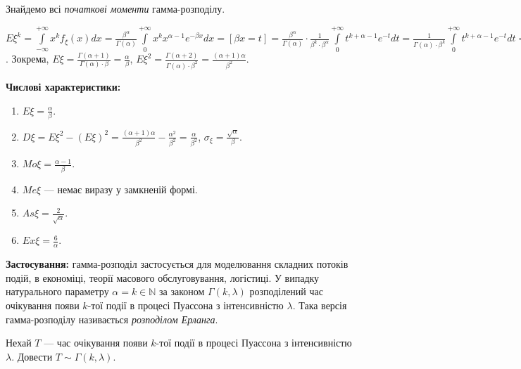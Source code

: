 Знайдемо всі \emph{початкові моменти} гамма-розподілу.

$E\xi^k = \int\limits_{-\infty}^{+\infty} x^k f_\xi(x)dx = \frac{\beta^\alpha}{\Gamma(\alpha)} \int\limits_0^{+\infty} x^k x^{\alpha-1} e^{-\beta x} dx = 
\left[ \beta x = t\right] = \frac{\beta^\alpha}{\Gamma(\alpha)} \cdot \frac{1}{\beta^k\cdot \beta^{\alpha}} \int\limits_0^{+\infty} t^{k+\alpha-1} e^{-t} dt = 
\frac{1}{\Gamma(\alpha) \cdot \beta^k} \int\limits_0^{+\infty} t^{k+\alpha-1} e^{-t} dt = \frac{\Gamma(\alpha+k)}{\Gamma(\alpha) \cdot \beta^k}$.
Зокрема, $E\xi = \frac{\Gamma(\alpha+1)}{\Gamma(\alpha) \cdot \beta} = \frac{\alpha}{\beta}$,
$E\xi^2 = \frac{\Gamma(\alpha+2)}{\Gamma(\alpha) \cdot \beta^2}  = \frac{(\alpha+1)\alpha}{\beta^2}$.

\noindent\textbf{Числові характеристики:}
\begin{enumerate}
    \item $E\xi = \frac{\alpha}{\beta}$.
    \item $D\xi = E\xi^2 - (E\xi)^2 = \frac{(\alpha+1)\alpha}{\beta^2} - \frac{\alpha^2}{\beta^2} = \frac{\alpha}{\beta^2}$, $\sigma_\xi = \frac{\sqrt{\alpha}}{\beta}$.
    \item ${Mo}\xi = \frac{\alpha-1}{\beta}$.
    \item ${Me}\xi$ --- немає виразу у замкненій формі.
    \item ${As}\xi = \frac{2}{\sqrt{\alpha}}$.
    \item ${Ex}\xi = \frac{6}{\alpha}$.
\end{enumerate}

\noindent\textbf{Застосування:} гамма-розподіл застосується для моделювання
складних потоків подій, в економіці, теорії масового обслуговування, логістиці.
У випадку натурального параметру $\alpha = k \in \mathbb{N}$ за законом
$\Gamma(k, \lambda)$ розподілений час очікування появи $k$-тої події
в процесі Пуассона з інтенсивністю $\lambda$. Така версія гамма-розподілу називається \emph{розподілом Ерланга}.
\begin{exercise}
    Нехай $T$ --- час очікування появи $k$-тої події
    в процесі Пуассона з інтенсивністю $\lambda$. Довести $T \sim \Gamma(k, \lambda)$.
\end{exercise} %
